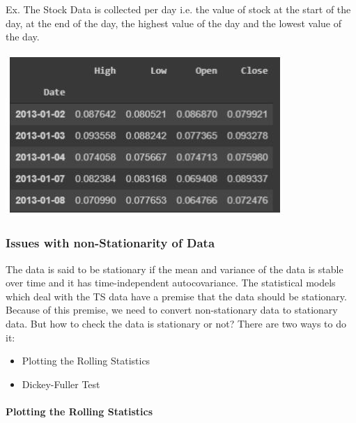 		Ex. The Stock Data is collected per day i.e. the value of stock at the start of the day, at the end of the day, the highest value of the day and the lowest value of the day.

		\begin{center}
		\includegraphics[width=\linewidth]{figures/Ex_of_Time_Series_data_of_a_stock.jpg}	
		\label{fig: Ex of Time Series data of a stock}
		\end{center}


	
	\subsubsection{Issues with non-Stationarity of Data}
	
		The data is said to be stationary if the mean and variance of the data is stable over time and it has time-independent autocovariance. The statistical models which deal with the TS data have a premise that the data should be stationary. Because of this premise, we need to convert non-stationary data to stationary data. But how to check the data is stationary or not? There are two ways to do it:
		\begin{itemize}
		
			\item Plotting the Rolling Statistics
			
			\item Dickey-Fuller Test

		\end{itemize}
		
		\paragraph{Plotting the Rolling Statistics}

